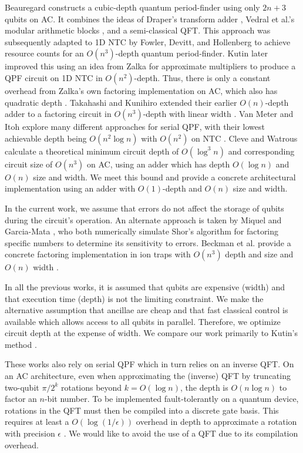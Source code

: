 \documentclass[twoside]{article}
\begin{document}
Beauregard \cite{Beauregard2002}
constructs a cubic-depth quantum period-finder using only $2n+3$ qubits on
\textsc{AC}.
It combines the ideas of Draper's transform adder \cite{Draper2000},
Vedral et al.'s modular arithmetic blocks \cite{Vedral1996}, and a
semi-classical QFT.
This approach was subsequently adapted to \textsc{1D NTC} by Fowler, Devitt,
and Hollenberg
\cite{Fowler2004} to achieve resource counts for an $O(n^3)$-depth
quantum period-finder. Kutin \cite{Kutin2006} later improved this using
an idea from Zalka for approximate multipliers to produce a QPF circuit on
\textsc{1D NTC}
in $O(n^2)$-depth. Thus, there is only a constant overhead from
Zalka's own factoring implementation on \textsc{AC}, which also has
quadratic depth \cite{Zalka1998}.
Takahashi and Kunihiro extended their earlier $O(n)$-depth adder to a factoring
circuit in $O(n^3)$-depth with linear width \cite{Takahashi2006}.
Van Meter and Itoh explore many different approaches for serial QPF,
with their lowest achievable depth being $O(n^2\log n)$ with
$O(n^2)$ on \textsc{NTC} \cite{VanMeter2005}. Cleve and Watrous
calculate a theoretical minimum circuit depth of $O(\log^3 n)$ and corresponding
circuit size of $O(n^3)$ on \textsc{AC},
using an adder which has depth $O(\log n)$ and
$O(n)$ size and width. We meet this bound and provide a concrete
architectural implementation using an adder with $O(1)$-depth and $O(n)$
size and width.

In the current work, we assume that errors do not affect the storage of qubits
during the circuit's operation. An alternate approach is taken by
Miquel \cite{Miquel1996} and Garcia-Mata \cite{GarciaMata2007}, who both
numerically simulate Shor's algorithm for factoring specific
numbers to determine its sensitivity to errors. Beckman et al. provide a
concrete factoring implementation in ion traps with $O(n^3)$ depth and size and
$O(n)$ width \cite{Beckman1996}.

In all the previous works,
it is assumed that qubits are expensive (width) and that
execution time (depth) is not the limiting constraint.
We make the alternative assumption that ancillae are cheap and that fast classical control
is available which allows access to all qubits in parallel.
Therefore, we optimize circuit depth at the expense of width.
We compare our work primarily to Kutin's method \cite{Kutin2006}.

These works also rely on serial QPF which in turn relies on an inverse QFT.
On an AC architecture, even when approximating the (inverse) QFT by truncating two-qubit
$\pi/2^k$ rotations beyond $k = O(\log n)$, 
the depth is $O(n \log n)$ to factor an $n$-bit number.
To be implemented fault-tolerantly on a quantum device, rotations in the QFT must then be compiled into a discrete gate basis.
This requires at least a $O(\log(1/\epsilon))$ overhead in depth to approximate a rotation with precision $\epsilon$ \cite{Harrow02, Kitaev2002}.
We would like to avoid the use of a QFT due to its compilation overhead.
\end{document}
